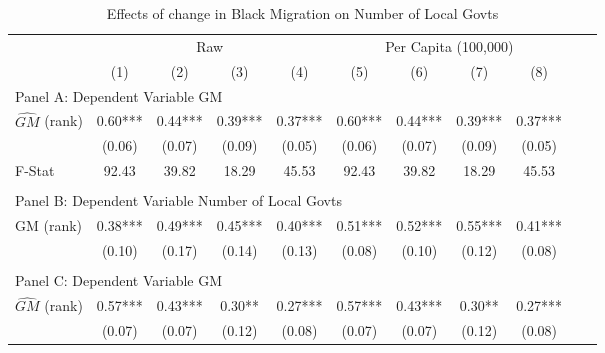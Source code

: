  \begin{table}[htbp]\centering {} \begin{threeparttable} \caption{Effects of change in Black Migration on Number of Local Govts} \begin{tabular}{l*{10}{c}} \toprule
                &\multicolumn{4}{c}{Raw}                                    &\multicolumn{4}{c}{Per Capita (100,000)}                   \\\cmidrule(lr){2-5}\cmidrule(lr){6-9}
                &\multicolumn{1}{c}{(1)}   &\multicolumn{1}{c}{(2)}   &\multicolumn{1}{c}{(3)}   &\multicolumn{1}{c}{(4)}   &\multicolumn{1}{c}{(5)}   &\multicolumn{1}{c}{(6)}   &\multicolumn{1}{c}{(7)}   &\multicolumn{1}{c}{(8)}   \\
\cmidrule(lr){1-9}
\multicolumn{8}{l}{Panel A: Dependent Variable GM}\\
\cmidrule(lr){1-9}
$\hat{GM}$ (rank)&       0.60***&       0.44***&       0.39***&       0.37***&       0.60***&       0.44***&       0.39***&       0.37***\\
                &     (0.06)   &     (0.07)   &     (0.09)   &     (0.05)   &     (0.06)   &     (0.07)   &     (0.09)   &     (0.05)   \\
\midrule
F-Stat          &      92.43   &      39.82   &      18.29   &      45.53   &      92.43   &      39.82   &      18.29   &      45.53   \\
\cmidrule[\heavyrulewidth](lr){1-9} \\ \cmidrule[\heavyrulewidth](lr){1-9}
\multicolumn{8}{l}{Panel B: Dependent Variable Number of Local Govts}\\
\cmidrule(lr){1-9}
GM  (rank)      &       0.38***&       0.49***&       0.45***&       0.40***&       0.51***&       0.52***&       0.55***&       0.41***\\
                &     (0.10)   &     (0.17)   &     (0.14)   &     (0.13)   &     (0.08)   &     (0.10)   &     (0.12)   &     (0.08)   \\
\cmidrule[\heavyrulewidth](lr){1-9} \\ \cmidrule[\heavyrulewidth](lr){1-9}
\multicolumn{8}{l}{Panel C: Dependent Variable GM}\\
\cmidrule(lr){1-9}
$\hat{GM}$ (rank)&       0.57***&       0.43***&       0.30** &       0.27***&       0.57***&       0.43***&       0.30** &       0.27***\\
                &     (0.07)   &     (0.07)   &     (0.12)   &     (0.08)   &     (0.07)   &     (0.07)   &     (0.12)   &     (0.08)   \\

\end{tabular}
\end{threeparttable}
\end{table}
